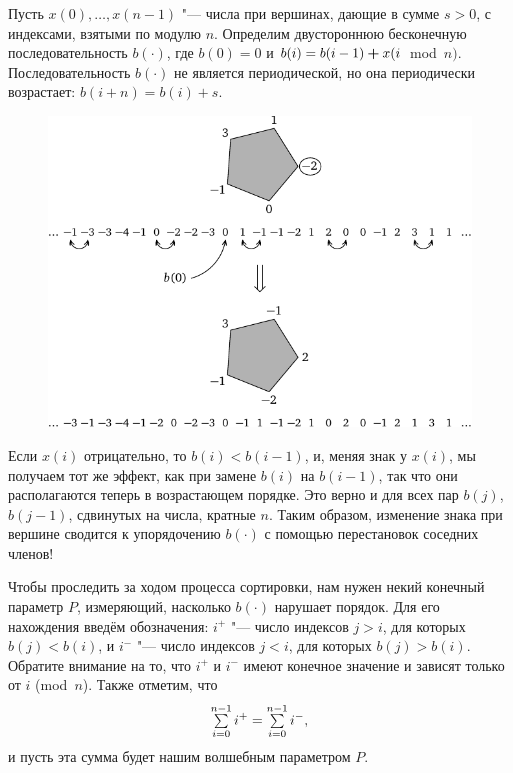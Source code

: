 \documentclass[twoside]{book}
\begin{document}
\medskip

Пусть $x(0),\dots,x(n-1)$ "--- числа при вершинах, дающие в сумме $s > 0$, с индексами, взятыми по модулю $n$.
Определим двустороннюю бесконечную последовательность
$b(\cdot)$, где $b(0) = 0$ и $b(i) = b(i -1) \hm+ x(i$~mod~${n})$.
Последовательность $b(\cdot)$ не является периодической, но она периодически возрастает: $b(i + n) = b(i) + s$.

\begin{figure}
\centering
\includegraphics{mp/wink-200}
\end{figure}

Если $x(i)$ отрицательно, то $b(i) < b(i-1)$, и, меняя знак у $x(i)$, мы получаем тот же эффект, как при замене $b(i)$ на $b(i - 1)$, так что они располагаются теперь в возрастающем порядке.
Это верно и для всех пар $b(j)$, $b(j - 1)$, сдвинутых на числа, кратные $n$.
Таким образом, изменение знака при вершине сводится к упорядочению $b(\cdot)$ с помощью перестановок соседних членов!

Чтобы проследить за ходом процесса сортировки, нам нужен некий конечный параметр $P$, измеряющий, насколько $b(\cdot)$ нарушает порядок. %
Для его нахождения введём обозначения: $i^+$ "--- число индексов $j > i$, для которых $b(j) < b(i)$, и $i^-$ "--- число индексов $j < i$, для которых $b(j) > b(i)$.
Обратите внимание на то, что $i^+$ и $i^-$ имеют конечное значение и зависят только от $i$ (mod~$n$).
Также отметим, что 
\[ \mathop{\textstyle\sum}\limits_{i=0}^{n-1}i^+= \mathop{\textstyle\sum}\limits_{i=0}^{n-1}i^-   ,
\]
и пусть эта сумма будет нашим волшебным параметром $P$.
\end{document}
